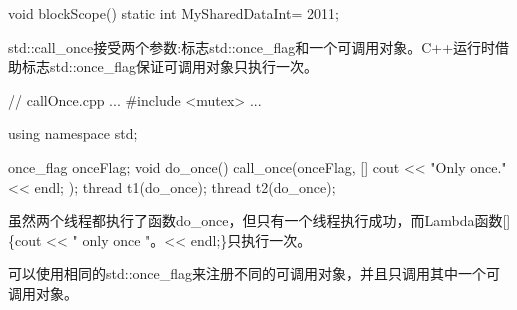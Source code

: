 \begin{cpp}
void blockScope(){
	static int MySharedDataInt= 2011;
}
\end{cpp}


std::call\_once接受两个参数:标志std::once\_flag和一个可调用对象。C++运行时借助标志std::once\_flag保证可调用对象只执行一次。


\begin{cpp}
// callOnce.cpp
...
#include <mutex>
...

using namespace std;

once_flag onceFlag;
void do_once(){
	call_once(onceFlag, []{ cout << "Only once." << endl; });
}
thread t1(do_once);
thread t2(do_once);
\end{cpp}

虽然两个线程都执行了函数do\_once，但只有一个线程执行成功，而Lambda函数[]\{cout <{}< " only once "。<{}< endl;\}只执行一次。


可以使用相同的std::once\_flag来注册不同的可调用对象，并且只调用其中一个可调用对象。


